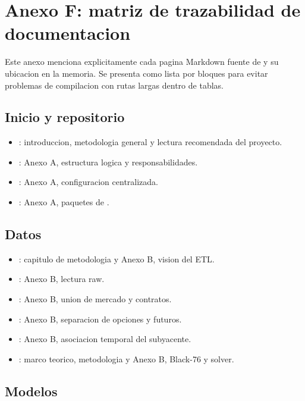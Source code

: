 \chapter{Anexo F: matriz de trazabilidad de documentacion}

Este anexo menciona explicitamente cada pagina Markdown fuente de  y su ubicacion en la memoria. Se presenta como lista por bloques para evitar problemas de compilacion con rutas largas dentro de tablas.

\section{Inicio y repositorio}

\begin{itemize}
  \item {}: introduccion, metodologia general y lectura recomendada del proyecto.
  \item {}: Anexo A, estructura logica y responsabilidades.
  \item {}: Anexo A, configuracion centralizada.
  \item {}: Anexo A, paquetes de .
\end{itemize}

\section{Datos}

\begin{itemize}
  \item {}: capitulo de metodologia y Anexo B, vision del ETL.
  \item {}: Anexo B, lectura raw.
  \item {}: Anexo B, union de mercado y contratos.
  \item {}: Anexo B, separacion de opciones y futuros.
  \item {}: Anexo B, asociacion temporal del subyacente.
  \item {}: marco teorico, metodologia y Anexo B, Black-76 y solver.
\end{itemize}

\section{Modelos}

